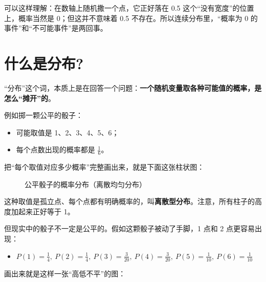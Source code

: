 \documentclass[lang=cn,10pt]{elegantbook}
\begin{document}
\begin{remark}
可以这样理解：在数轴上随机撒一个点，它正好落在 0.5 这个“没有宽度”的位置上，概率当然是 0；但这并不意味着 0.5 不存在。所以连续分布里，“概率为 0 的事件”和“不可能事件”是两回事。
\end{remark}

\section{什么是分布?}
“分布”这个词，本质上是在回答一个问题：\textbf{一个随机变量取各种可能值的概率，是怎么“摊开”的}。

例如掷一颗公平的骰子：
\begin{itemize}
  \item 可能取值是 1、2、3、4、5、6；
  \item 每个点数出现的概率都是 $\frac{1}{6}$。
\end{itemize}
把“每个取值对应多少概率”完整画出来，就是下面这张柱状图：

\begin{figure}[H]
  \centering
  \caption{公平骰子的概率分布（离散均匀分布）}
\end{figure}

这种取值是孤立点、每个点都有明确概率的，叫\textbf{离散型分布}。注意，所有柱子的高度加起来正好等于 1。

但现实中的骰子不一定是公平的。假如这颗骰子被动了手脚，1 点和 2 点更容易出现：
\begin{itemize}
  \item $P(1)=\frac{1}{4},\ P(2)=\frac{1}{4},\ P(3)=\frac{3}{20},\ P(4)=\frac{3}{20},\ P(5)=\frac{1}{10},\ P(6)=\frac{1}{10}$
\end{itemize}
画出来就是这样一张“高低不平”的图：
\end{document}
